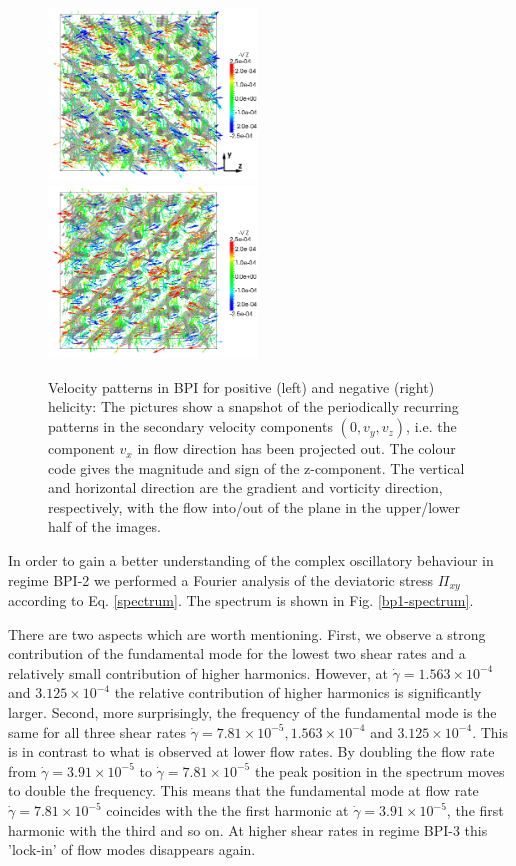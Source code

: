 \documentclass[aps,pre,reprint,superscriptaddress, twocolumn]{revtex4}
\newcommand{\e}[1]{\times10^{#1}}
\newcommand{\gd}{\dot{\gamma}}
\begin{document}
\begin{figure}[htpb]
\includegraphics[width=0.495\textwidth]{v_yz-v_z-360k_run914.png}
\includegraphics[width=0.495\textwidth]{v_yz-v_z-360k_run922.png}
\caption{Velocity patterns in BPI for positive (left) and negative (right) helicity: 
The pictures show a snapshot of the periodically recurring patterns in the 
secondary velocity components $(0,v_y,v_z)$, i.e. the component $v_x$ in flow direction 
has been projected out. The colour code gives the magnitude and sign 
of the z-component. The vertical and horizontal direction are the gradient and 
vorticity direction, respectively, with the flow into/out of the plane in the 
upper/lower half of the images.}
\label{bp1-velo}
\end{figure}

In order to gain a better understanding of the complex oscillatory behaviour in regime BPI-2 
we performed a Fourier analysis of the deviatoric stress $\Pi_{xy}$ according to Eq. \ref{spectrum}. 
The spectrum is shown in Fig. \ref{bp1-spectrum}. 

There are two aspects which are worth mentioning. First, we observe a strong contribution of 
the fundamental mode for the lowest two shear rates and a relatively small contribution of higher harmonics. 
However, at $\gd=1.563\e{-4}$ and $3.125\e{-4}$ the relative contribution of higher harmonics is 
significantly larger. 
Second, more surprisingly, the frequency of the fundamental mode is the same 
for all three shear rates $\gd=7.81\e{-5}, 1.563\e{-4}$ and $3.125\e{-4}$. This is 
in contrast to what is observed at lower flow rates. By doubling the flow rate from 
$\gd=3.91\e{-5}$ to $\gd=7.81\e{-5}$ the peak position in the spectrum 
moves to double the frequency. This means that the fundamental mode at flow rate $\gd=7.81\e{-5}$ 
coincides with the the first harmonic at $\gd=3.91\e{-5}$, the first harmonic with the third and so on. 
At higher shear rates in regime BPI-3 this 'lock-in' of flow modes disappears again.  
 
\end{document}
